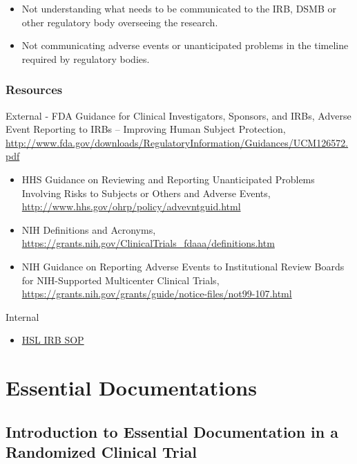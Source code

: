 \documentclass[]{book}
\providecommand{\tightlist}{%
  \setlength{\itemsep}{0pt}\setlength{\parskip}{0pt}}
\begin{document}
\begin{itemize}
\item
  Not understanding what needs to be communicated to the IRB, DSMB or
  other regulatory body overseeing the research.
\item
  Not communicating adverse events or unanticipated problems in the
  timeline required by regulatory bodies.
\end{itemize}

\subsection{Resources}\label{resources-10}

External - FDA Guidance for Clinical Investigators, Sponsors, and IRBs,
Adverse Event Reporting to IRBs -- Improving Human Subject Protection,
\url{http://www.fda.gov/downloads/RegulatoryInformation/Guidances/UCM126572.pdf}

\begin{itemize}
\item
  HHS Guidance on Reviewing and Reporting Unanticipated Problems
  Involving Risks to Subjects or Others and Adverse Events,
  \url{http://www.hhs.gov/ohrp/policy/advevntguid.html}
\item
  NIH Definitions and Acronyms,
  \url{https://grants.nih.gov/ClinicalTrials_fdaaa/definitions.htm}
\item
  NIH Guidance on Reporting Adverse Events to Institutional Review
  Boards for NIH-Supported Multicenter Clinical Trials,
  \url{https://grants.nih.gov/grants/guide/notice-files/not99-107.html}
\end{itemize}

Internal

\begin{itemize}
\tightlist
\item
  \href{http://thehslhub/~/media/HSLNet/Docs/IFAR/IRB/IRB_SOP.ashx}{HSL
  IRB SOP}
\end{itemize}

\chapter{Essential Documentations}\label{essential-documentations}

\section{Introduction to Essential Documentation in a Randomized
Clinical
Trial}\label{introduction-to-essential-documentation-in-a-randomized-clinical-trial}
\end{document}
